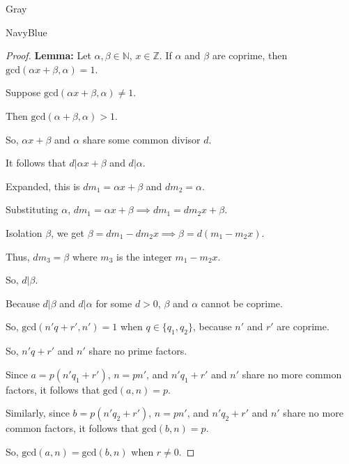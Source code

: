 \documentclass[12pt]{amsart}
\theoremstyle{named}
\newenvironment{prf}
{\medskip\begin{color}{Gray}\begin{framed}\begin{color}{NavyBlue}\begin{proof}[Proof]
\doublespacing}
{\end{proof}\end{color}\end{framed}\end{color}\medskip}
\theoremstyle{definition}
\begin{document}
\begin{prf}
	\textbf{Lemma:} Let $\alpha, \beta \in \mathbb N$, $x \in \mathbb Z$. If $\alpha$ and $\beta$ are 
	coprime, then $\text{gcd}(\alpha x+\beta,\alpha) = 1$.

	\begin{adjustwidth}{2em}{0em}		
		Suppose $\text{gcd}(\alpha x+\beta ,\alpha) \neq 1$.

		Then $\text{gcd}(\alpha +\beta ,\alpha) > 1$.

		So, $\alpha x+\beta $ and $\alpha$ share some common divisor $d$.

		It follows that $d|\alpha x+\beta $ and $d|\alpha$.

		Expanded, this is $dm_1 = \alpha x +\beta $ and $dm_2 = \alpha$.

		Substituting $\alpha$, $dm_1 = \alpha x+\beta  \implies dm_1 = dm_2x+\beta $.

		Isolation $\beta $, we get $\beta  = dm_1 - dm_2x \implies \beta  = d(m_1-m_2x)$.

		Thus, $dm_3 = \beta $ where $m_3$ is the integer $m_1-m_2x$.

		So, $d|\beta $. 

		Because $d|\beta $ and $d|\alpha$ for some $d > 0$, $\beta$ and $\alpha$ cannot
		be coprime.
	\end{adjustwidth}

	So, $\text{gcd}(n'q+r',n') = 1$ when $q \in \{q_1,q_2\}$, because $n'$ and $r'$ are coprime. 

	So, $n'q+r'$ and $n'$ share no prime factors.

	Since $a = p(n'q_1+r')$, 
	$n = pn'$, and $n'q_1+r'$ and $n'$ share no more common factors, it follows that 
	$\text{gcd}(a,n) = p$.

	Similarly, since $b = p(n'q_2+r')$, $n = pn'$, and $n'q_2+r'$ and $n'$ 
	share no more common factors, it follows that $\text{gcd}(b,n) = p$.

	So, $\text{gcd}(a,n) = \text{gcd}(b,n)$ when $r \neq 0$. 

	
\end{prf}
\end{document}
